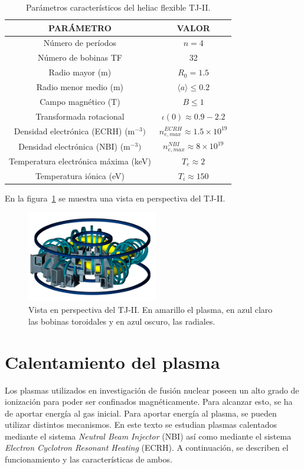 \begin{table}[H]
    \centering
    \begin{tabular}{cc}
    \hline
    PARÁMETRO & VALOR \\ \hline
    Número de períodos          & $n=4$       \\
    Número de bobinas TF          & 32       \\
    Radio mayor (m)          & $R_0=1.5$      \\
    Radio menor medio (m)          & $\langle a\rangle\leq 0.2$       \\
    Campo magnético (T)          & $B\leq 1$       \\
    Transformada rotacional          & $\iota(0)\approx0.9-2.2$       \\
    Densidad electrónica (ECRH) (m$^{-3})$          & $n^{ECRH}_{e,max}\approx 1.5\times 10^{19}$       \\
    Densidad electrónica (NBI) (m$^{-3})$          & $n^{NBI}_{e,max}\approx 8\times 10^{19}$       \\
    Temperatura electrónica máxima (keV)          & $T_e\approx 2$      \\
    Temperatura iónica (eV)          & $T_i\approx 150$      \\ \hline
    \end{tabular}
    \caption{Parámetros característicos del heliac flexible TJ-II.}
    \label{tab:tj2}
\end{table}
En la figura~\ref{fig:view} se muestra una vista en perspectiva del TJ-II.
\begin{figure}[h!]
    \centering
    \includegraphics[height=4cm]{img/view.png}
    \caption[Vista en perspectiva del TJ-II]{Vista en perspectiva del TJ-II. En amarillo el plasma, en azul claro las bobinas toroidales y en azul oscuro, las radiales.}
    \label{fig:view}
\end{figure}
\section{Calentamiento del plasma}
Los plasmas utilizados en investigación de fusión nuclear poseen un alto grado de ionización 
para poder ser confinados magnéticamente. Para alcanzar esto, se ha de aportar energía al
gas inicial.
Para aportar energía al plasma, se pueden utilizar distintos mecanismos. En este texto se estudian
plasmas calentados mediante el sistema \textit{Neutral Beam Injector} (NBI) así como mediante
el sistema \textit{Electron Cyclotron Resonant Heating} (ECRH). A continuación, se describen
el funcionamiento y las características de ambos.
